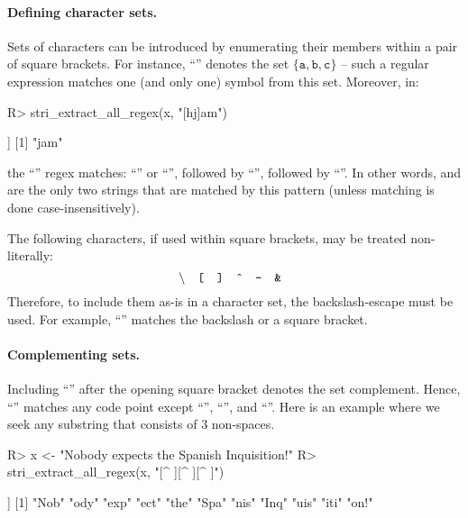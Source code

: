 \documentclass[nojss]{jss}
\begin{document}
\paragraph{Defining character sets.}
Sets of characters can be introduced by enumerating
their members within a pair of
square brackets.
For instance, ``\code{[abc]}'' denotes the set $\{\mathtt{a},\mathtt{b},\mathtt{c}\}$
-- such a regular expression matches one (and only one) symbol from this set.
Moreover, in:


\begin{Schunk}
\begin{Sinput}
R> stri_extract_all_regex(x, "[hj]am")
\end{Sinput}
\begin{Soutput}
[[1]]
[1] "jam"
\end{Soutput}
\end{Schunk}


\noindent
the ``'' regex matches:
``'' or ``'', followed by ``'', followed by ``''.
In other words,  and 
are the only two strings that are matched by this pattern
(unless matching is done case-insensitively).


The following characters, if used within square brackets, may be treated
non-literally:
\[
\text{
  \textbackslash{}\quad
  \texttt{[}\quad
  \texttt{]}\quad
  \texttt{\^{}}\quad
  \texttt{{}-{}}\quad
  \texttt{\&}\quad
}
\]
Therefore, to include them as-is in a character set, the
backslash-escape must be used.
For example, ``\code{[\textbackslash[\textbackslash]\textbackslash\textbackslash]}'' matches
the backslash or a square bracket.

\paragraph{Complementing sets.}
Including ``\code{\^{}}'' after the opening square bracket denotes the set complement.
Hence, ``\code{[\^{}abc]}'' matches any code point except ``'',
``'', and ``''.
Here is an example where we seek any substring that consists of 3 non-spaces.

\begin{Schunk}
\begin{Sinput}
R> x <- "Nobody expects the Spanish Inquisition!"
R> stri_extract_all_regex(x, "[^ ][^ ][^ ]")
\end{Sinput}
\begin{Soutput}
[[1]]
 [1] "Nob" "ody" "exp" "ect" "the" "Spa" "nis" "Inq" "uis" "iti" "on!"
\end{Soutput}
\end{Schunk}
\end{document}
